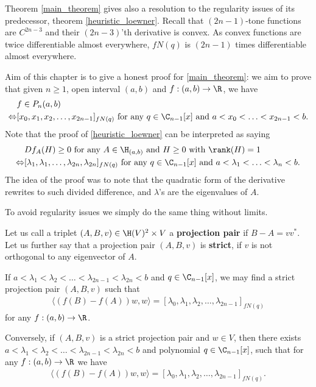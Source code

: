 Theorem \ref{main_theorem} gives also a resolution to the regularity issues of its predecessor, theorem \ref{heuristic_loewner}. Recall that $(2 n - 1)$-tone functions are $C^{2 n - 3}$ and their $(2 n - 3)$'th derivative is convex. As convex functions are twice differentiable almost everywhere, $f N(q)$ is $(2 n - 1)$ times differentiable almost everywhere.

Aim of this chapter is to give a honest proof for \ref{main_theorem}: we aim to prove that given $n \geq 1$, open interval $(a, b)$ and $f : (a, b) \to \R$, we have 
\begin{align*}
	& f \in P_{n}(a, b) \\
	\Leftrightarrow &[x_{0}, x_{1}, x_{2}, \ldots, x_{2 n - 1}]_{f N(q)} \text{ for any $q \in \C_{n - 1}[x]$ and $a < x_{0} < \ldots < x_{2 n - 1} < b$}.
\end{align*}
Note that the proof of \ref{heuristic_loewner} can be interpreted as saying
\begin{align*}
	& D f_{A}(H) \geq 0 \text{ for any $A \in \H_{(a, b)}$ and $H \geq 0$ with $\rank(H) = 1$} \\
	\Leftrightarrow &[\lambda_{1}, \lambda_{1}, \ldots, \lambda_{2 n}, \lambda_{2 n}]_{f N(q)} \text{ for any $q \in \C_{n - 1}[x]$ and $a < \lambda_{1} < \ldots < \lambda_{n} < b$}.
\end{align*}
The idea of the proof was to note that the quadratic form of the derivative rewrites to such divided difference, and $\lambda$'s are the eigenvalues of $A$.

To avoid regularity issues we simply do the same thing without limits.

\begin{maar}
	Let us call a triplet $(A, B, v) \in \H(V)^{2} \times V$ a \textbf{projection pair} if $B - A = v v^{*}$. Let us further say that a projection pair $(A, B, v)$ is \textbf{strict}, if $v$ is not orthogonal to any eigenvector of $A$. 
\end{maar}

\begin{lem}\label{main_lemma}
	If $a < \lambda_{1} < \lambda_{2} < \ldots < \lambda_{2 n - 1} < \lambda_{2 n} < b$ and $q \in \C_{n - 1}[x]$, we may find a strict projection pair $(A, B, v)$ such that
	\begin{align*}
		\langle (f(B) - f(A)) w, w \rangle = [\lambda_{0}, \lambda_{1}, \lambda_{2}, \ldots, \lambda_{2 n - 1}]_{f N(q)}
	\end{align*}
	for any $f : (a, b) \to \R$.

	Conversely, if $(A, B, v)$ is a strict projection pair and $w \in V$, then there exists $a < \lambda_{1} < \lambda_{2} < \ldots < \lambda_{2 n - 1} < \lambda_{2 n} < b$ and polynomial $q \in \C_{n - 1}[x]$, such that for any $f : (a, b) \to \R$ we have
	\begin{align*}
		\langle (f(B) - f(A)) w, w \rangle = [\lambda_{0}, \lambda_{1}, \lambda_{2}, \ldots, \lambda_{2 n - 1}]_{f N(q)}.
	\end{align*}
\end{lem}

